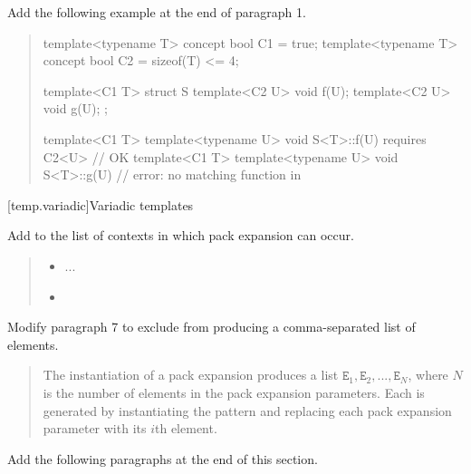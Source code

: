 Add the following example at the end of paragraph 1.

\begin{quote}
\begin{addedblock}
\enterexample
\begin{codeblock}
template<typename T> concept bool C1 = true;
template<typename T> concept bool C2 = sizeof(T) <= 4;

template<C1 T>
  struct S {
    template<C2 U> void f(U);
    template<C2 U> void g(U);
  };

template<C1 T> template<typename U> 
  void S<T>::f(U) requires C2<U> { } // OK
template<C1 T> template<typename U> 
  void S<T>::g(U) { }                // error: no matching function in 
\end{codeblock}
\exitexample
\end{addedblock}
\end{quote}


[temp.variadic]{Variadic templates}

Add  to the list of contexts in which
pack expansion can occur. 

\begin{quote}
\begin{itemize}
\item ...

\item {}
\end{itemize}
\end{quote}

Modify paragraph 7 to exclude  from
producing a comma-separated list of elements.

\begin{quote}
The instantiation of a pack expansion
produces a list
$\mathtt{E}_1, \mathtt{E}_2, ..., \mathtt{E}_N$,
where $N$ is the number of 
elements in the pack expansion parameters. 
% 
Each  is generated by instantiating 
the pattern and replacing each pack expansion 
parameter with its $i$th element.
\end{quote}


Add the following paragraphs at the end of this section.

